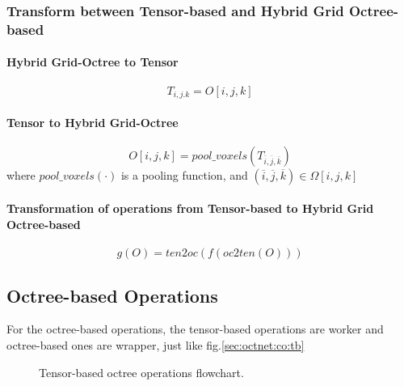 \documentclass[border=0.5in]{blog}
\begin{document}
    \subsubsection{Transform between Tensor-based and Hybrid Grid Octree-based}
    \label{sec:octnet:co:trans}
    
    \paragraph{Hybrid Grid-Octree to Tensor}
        \begin{equation}
        T_{i,j.k} = O[i,j,k]
        \end{equation}
    \paragraph{Tensor to Hybrid Grid-Octree}
        \begin{equation}
        O[i,j,k] = pool\_voxels\left(T_{\overline{i},\overline{j},\overline{k}}\right)
        \end{equation}
        where $pool\_voxels(\cdot)$ is a pooling function, and $(\overline{i},\overline{j},\overline{k})\in \Omega[i,j,k]$
    \paragraph{Transformation of operations from Tensor-based to Hybrid Grid Octree-based}
        \begin{equation}
        g(O)=ten2oc(f(oc2ten(O)))
        \end{equation}
    
    \subsection{Octree-based Operations}
    \label{sec:octnet:oo}
    
    For the octree-based operations, the tensor-based operations are worker
    and octree-based ones are wrapper, just like fig.\ref{sec:octnet:co:tb}    
    
    \begin{figure}
        \centering
        \caption{Tensor-based octree operations flowchart.}
        \label{sec:octnet:to-fc}
    \end{figure}
\end{document}
